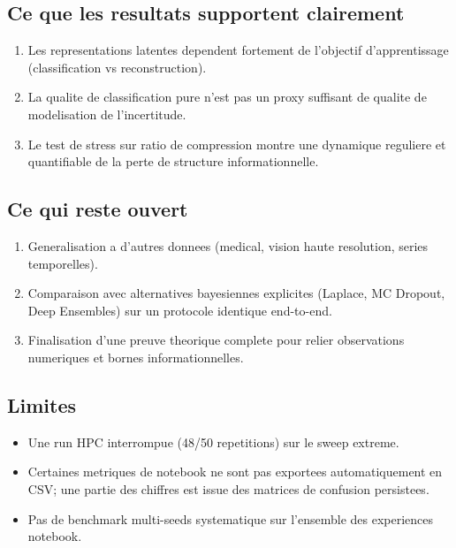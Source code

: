 \documentclass[11pt,a4paper]{article}
\begin{document}
\subsection{Ce que les resultats supportent clairement}
\begin{enumerate}[leftmargin=1.2cm]
    \item Les representations latentes dependent fortement de l'objectif d'apprentissage (classification vs reconstruction).
    \item La qualite de classification pure n'est pas un proxy suffisant de qualite de modelisation de l'incertitude.
    \item Le test de stress sur ratio de compression montre une dynamique reguliere et quantifiable de la perte de structure informationnelle.
\end{enumerate}

\subsection{Ce qui reste ouvert}
\begin{enumerate}[leftmargin=1.2cm]
    \item Generalisation a d'autres donnees (medical, vision haute resolution, series temporelles).
    \item Comparaison avec alternatives bayesiennes explicites (Laplace, MC Dropout, Deep Ensembles) sur un protocole identique end-to-end.
    \item Finalisation d'une preuve theorique complete pour relier observations numeriques et bornes informationnelles.
\end{enumerate}

\subsection{Limites}
\begin{itemize}[leftmargin=1.2cm]
    \item Une run HPC interrompue (48/50 repetitions) sur le sweep extreme.
    \item Certaines metriques de notebook ne sont pas exportees automatiquement en CSV; une partie des chiffres est issue des matrices de confusion persistees.
    \item Pas de benchmark multi-seeds systematique sur l'ensemble des experiences notebook.
\end{itemize}
\end{document}
